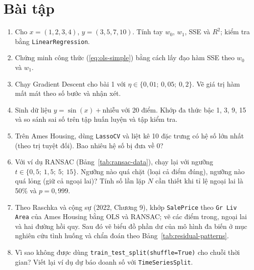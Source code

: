 \section{Bài tập}
\begin{enumerate}
    \item Cho $x = (1, 2, 3, 4)$, $y = (3, 5, 7, 10)$. Tính tay $w_0$, $w_1$, SSE và $R^2$; kiểm tra bằng \texttt{LinearRegression}.
    \item Chứng minh công thức (\ref{eq:ols-simple}) bằng cách lấy đạo hàm SSE theo $w_0$ và $w_1$.
    \item Chạy Gradient Descent cho bài 1 với $\eta \in \{0{,}01;\ 0{,}05;\ 0{,}2\}$. Vẽ giá trị hàm mất mát theo số bước và nhận xét.
    \item Sinh dữ liệu $y = \sin(x) + \text{nhiễu}$ với 20 điểm. Khớp đa thức bậc 1, 3, 9, 15 và so sánh sai số trên tập huấn luyện và tập kiểm tra.
    \item Trên Ames Housing, dùng \texttt{LassoCV} và liệt kê 10 đặc trưng có hệ số lớn nhất (theo trị tuyệt đối). Bao nhiêu hệ số bị đưa về 0?
    \item Với ví dụ RANSAC (Bảng~\ref{tab:ransac-data}), chạy lại với ngưỡng $t \in \{0{,}5;\ 1{,}5;\ 5;\ 15\}$. Ngưỡng nào quá chặt (loại cả điểm đúng), ngưỡng nào quá lỏng (giữ cả ngoại lai)? Tính số lần lặp $N$ cần thiết khi tỉ lệ ngoại lai là 50\% và $p = 0{,}999$.
    \item Theo Raschka và cộng sự (2022, Chương 9), khớp \texttt{SalePrice} theo \texttt{Gr Liv Area} của Ames Housing bằng OLS và RANSAC; vẽ các điểm trong, ngoại lai và hai đường hồi quy. Sau đó vẽ biểu đồ phần dư của mô hình đa biến ở mục nghiên cứu tình huống và chẩn đoán theo Bảng~\ref{tab:residual-patterns}.
    \item Vì sao không được dùng \texttt{train\_test\_split(shuffle=True)} cho chuỗi thời gian? Viết lại ví dụ dự báo doanh số với \texttt{TimeSeriesSplit}.
\end{enumerate}

